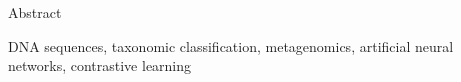 \cleardoublepage{}

\secondabstract{}

Abstract

\secondkeywords{}
DNA sequences, taxonomic classification,  metagenomics, artificial neural networks, contrastive learning